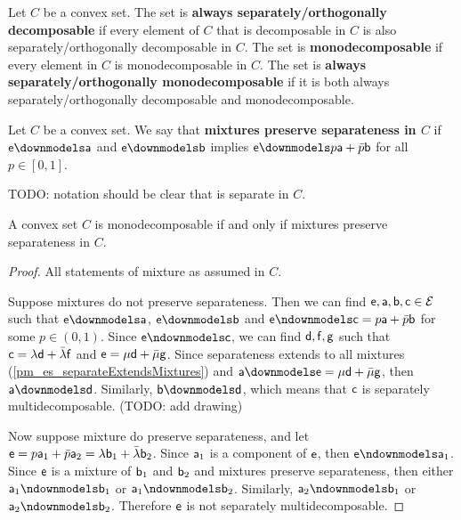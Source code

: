 \begin{prop}
	Let $C$ be a convex set. The set is \textbf{always separately/orthogonally decomposable} if every element of $C$ that is decomposable in $C$ is also separately/orthogonally decomposable in $C$. The set is \textbf{monodecomposable} if every element in $C$ is monodecomposable in $C$. The set is \textbf{always separately/orthogonally monodecomposable} if it is both always separately/orthogonally decomposable and monodecomposable.
\end{prop}

\begin{defn}
	Let $C$ be a convex set. We say that \textbf{mixtures preserve separateness in $C$} if $\ens \separate \ens[a]$ and $\ens \separate \ens[b]$ implies $\ens \separate p \ens[a] + \bar{p} \ens[b]$ for all $p \in [0,1]$.
	
	TODO: notation should be clear that is separate in $C$.
\end{defn}

\begin{prop}
	A convex set $C$ is monodecomposable if and only if mixtures preserve separateness in $C$.
\end{prop}

\begin{proof}
	All statements of mixture as assumed in $C$.
	
	Suppose mixtures do not preserve separateness. Then we can find $\ens,\ens[a],\ens[b], \ens[c] \in \Ens$ such that $\ens \separate \ens[a]$, $\ens \separate \ens[b]$ and $\ens \nseparate \ens[c] = p \ens[a] + \bar{p} \ens[b]$ for some $p \in (0,1)$. Since $\ens \nseparate \ens[c]$, we can find $\ens[d], \ens[f], \ens[g]$ such that $\ens[c] = \lambda \ens[d] + \bar{\lambda} \ens[f]$ and $\ens = \mu \ens[d] + \bar{\mu} \ens[g]$.  Since separateness extends to all mixtures (\ref{pm_es_separateExtendsMixtures}) and $\ens[a] \separate \ens[e] = \mu \ens[d] + \bar{\mu} \ens[g]$, then $\ens[a] \separate \ens[d]$. Similarly, $\ens[b] \separate \ens[d]$, which means that $\ens[c]$ is separately multidecomposable. (TODO: add drawing)
	
	Now suppose mixture do preserve separateness, and let $\ens = p \ens[a]_1 + \bar{p} \ens[a]_2 = \lambda \ens[b]_1 +\bar{\lambda} \ens[b]_2$. Since $\ens[a]_1$ is a component of $\ens$, then $\ens \nseparate \ens[a]_1$. Since $\ens$ is a mixture of $\ens[b]_1$ and $\ens[b]_2$ and mixtures preserve separateness, then either $\ens[a]_1 \nseparate \ens[b]_1$ or $\ens[a]_1 \nseparate \ens[b]_2$. Similarly, $\ens[a]_2 \nseparate \ens[b]_1$ or $\ens[a]_2 \nseparate \ens[b]_2$. Therefore $\ens$ is not separately multidecomposable.
\end{proof}

